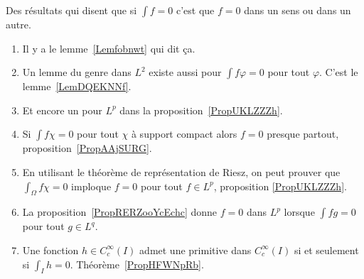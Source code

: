 
Des résultats qui disent que si \( \int f=0\) c'est que \( f=0\) dans un sens ou dans un autre.
\begin{enumerate}
	\item
	      Il y a le lemme~\ref{Lemfobnwt} qui dit ça.
	\item
	      Un lemme du genre dans \( L^2\) existe aussi pour \( \int f\varphi=0\) pour tout \( \varphi\). C'est le lemme~\ref{LemDQEKNNf}.
	\item
	      Et encore un pour \( L^p\) dans la proposition~\ref{PropUKLZZZh}.
	\item
	      Si \( \int f\chi=0\) pour tout \( \chi\) à support compact alors \( f=0\) presque partout, proposition~\ref{PropAAjSURG}.
	\item
	      En utilisant le théorème de représentation de Riesz, on peut prouver que \( \int_{\Omega}f\chi=0\) imploque \( f=0\) pour tout \( f\in L^p\), proposition \ref{PropUKLZZZh}.
	\item
	      La proposition~\ref{PropRERZooYcEchc} donne \( f=0\) dans \( L^p\) lorsque \( \int fg=0\) pour tout \( g\in L^q\).
	\item
	      Une fonction \( h\in C^{\infty}_c(I)\) admet une primitive dans \(  C^{\infty}_c(I)\) si et seulement si \( \int_Ih=0\). Théorème~\ref{PropHFWNpRb}.
\end{enumerate}
